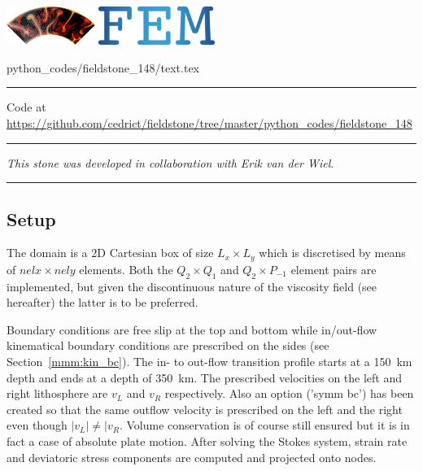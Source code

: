 \includegraphics[height=1.25cm]{images/pictograms/aspect_logo}
\includegraphics[height=1.25cm]{images/pictograms/FEM}


\begin{flushright} {\tiny {\color{gray} python\_codes/fieldstone\_148/text.tex}} \end{flushright}



\par\noindent\rule{\textwidth}{0.4pt}

\begin{center}
Code at \url{https://github.com/cedrict/fieldstone/tree/master/python_codes/fieldstone_148}
\end{center}

\par\noindent\rule{\textwidth}{0.4pt}

{\sl This stone was developed in collaboration with Erik van der Wiel}. 

\par\noindent\rule{\textwidth}{0.4pt}


\subsection*{Setup}

The domain is a 2D Cartesian box of size $L_x \times L_y$ which is discretised by means of 
$nelx \times nely$ elements. Both the $Q_2\times Q_1$ and $Q_2 \times P_{-1}$
element pairs are implemented, but given the discontinuous nature of the viscosity
field (see hereafter) the latter is to be preferred. 

Boundary conditions are free slip at the top and bottom while in/out-flow
kinematical boundary conditions are prescribed on the sides (see Section~\ref{mmm:kin_bc}). 
The in- to out-flow transition profile starts at a 150~\si{\km} depth and ends at a depth of 350~\si{\km}.
The prescribed velocities on the left and right lithosphere are $v_L$ and $v_R$ respectively.
Also an option ('symm bc') has been created so that the same outflow velocity is prescribed 
on the left and the right even though $|v_L| \neq |v_R$. Volume conservation is of course 
still ensured but it is in fact a case of absolute plate motion.
After solving the Stokes system, strain rate and deviatoric stress components are 
computed and projected onto nodes.

